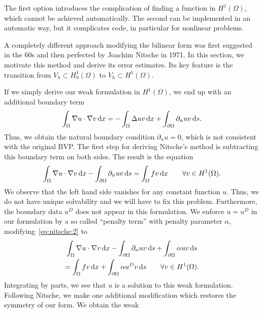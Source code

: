 \begin{intro}
The first option introduces the complication of finding a function in
$H^1(\Omega)$, which cannot be achieved automatically. The second can
be implemented in an automatic way, but it complicates code, in
particular for nonlinear problems.

A completely different approach modifying the bilinear form was first
suggested in the 60s and then perfected by Joachim Nitsche in 1971. In
this section, we motivate this method and derive its error
estimates. Its key feature is the transition from
$V_h \subset H^1_0(\Omega)$ to $V_h \subset H^1(\Omega)$.
\end{intro}

\begin{intro}
  If we simply derive our weak formulation in $H^1(\Omega)$, we end up
  with an additional boundary term
  \begin{gather}
    \int_\Omega \nabla u \cdot \nabla v \,\mathrm{d} x
    =
    - \int_\Omega \Delta u v \,\mathrm{d} x
    + \int_{\partial\Omega} \partial_n u v \,\mathrm{d} s.
  \end{gather}
  Thus, we obtain the natural boundary condition $\partial_n u=0$,
  which is not consistent with the original BVP. The first step for
  deriving Nitsche's method is subtracting this boundary term on both
  sides. The result is the equation
  \begin{gather}
    \label{eq:nitsche:2}
    \int_\Omega \nabla u \cdot \nabla v \,\mathrm{d} x
    -\int_{\partial\Omega} \partial_n u v \,\mathrm{d} s
    = \int_\Omega fv\,\mathrm{d} x
    \qquad\forall v\in H^1(\Omega).
  \end{gather}
  We observe that the left hand side vanishes for any constant
  function $u$. Thus, we do not have unique solvability and we will
  have to fix this problem. Furthermore, the boundary data $u^D$ does
  not appear in this formulation. We enforce $u=u^D$ in our
  formulation by a so called ``penalty term'' with penalty parameter
  $\alpha$, modifying~\eqref{eq:nitsche:2} to
  \begin{multline}
    \label{eq:nitsche:3}
    \int_\Omega \nabla u \cdot \nabla v \,\mathrm{d} x
    -\int_{\partial\Omega} \partial_n u v \,\mathrm{d} s
    + \int_{\partial\Omega} \alpha u v \,\mathrm{d} s
    \\
    = \int_\Omega fv\,\mathrm{d} x
    + \int_{\partial\Omega} \alpha u^D v \,\mathrm{d} s
    \qquad\forall v\in H^1(\Omega).
  \end{multline}
  Integrating by parts, we see that $u$ is a solution to this weak
  formulation. Following Nitsche, we make one additional modification
  which restores the symmetry of our form. We obtain the weak

\end{intro}
